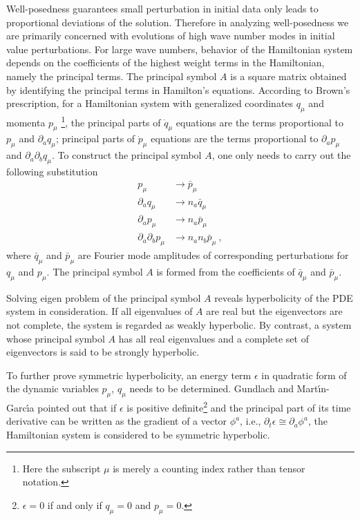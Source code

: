 Well-posedness guarantees small perturbation in initial data only leads to proportional deviations of the solution. Therefore in analyzing well-posedness we are primarily concerned with evolutions of high wave number modes in initial value perturbations. For large wave numbers, behavior of the Hamiltonian system depends on the coefficients of the highest weight terms in the Hamiltonian, namely the principal terms. The principal symbol $A$ is a square matrix obtained by identifying the principal terms in Hamilton's equations. According to Brown's prescription\cite{Brown:2008cca}, for a Hamiltonian system with generalized coordinates $q_{\mu}$ and momenta $p_{\mu}$ \footnote{Here the subscript $\mu$ is merely a counting index rather than tensor notation.}, the principal parts of ${\dot q}_{\mu}$ equations are the terms proportional to $p_{\mu}$ and $\partial_{a}q_{\mu}$; principal parts of ${\dot p}_{\mu}$ equations are the terms proportional to $\partial_{a}p_{\mu}$ and $\partial_{a}\partial_{b}q_{\mu}$. To construct the principal symbol $A$, one only needs to carry out the following substitution
\begin{subequations}\label{substitution}
\begin{align}
p_{\mu} & \rightarrow {\bar p}_{\mu}\\
\partial_{a}q_{\mu} &\rightarrow n_{a}{\bar q}_{\mu}\\
\partial_{a}p_{\mu} & \rightarrow n_{a}{\bar p}_{\mu}\\
\partial_{a}\partial_{b}p_{\mu} & \rightarrow n_{a}n_{b}{\bar p}_{\mu} \ ,
\end{align}
\end{subequations}
where ${\bar q}_{\mu}$ and ${\bar p}_{\mu}$ are Fourier mode amplitudes of corresponding perturbations for $q_{\mu}$ and $p_{\mu}$. The principal symbol $A$ is formed from the coefficients of ${\bar q}_{\mu}$ and ${\bar p}_{\mu}$. 

Solving eigen problem of the principal symbol $A$ reveals hyperbolicity of the PDE system in consideration. If all eigenvalues of $A$ are real but the eigenvectors are not complete, the system is regarded as weakly hyperbolic. By contrast, a system whose principal symbol $A$ has all real eigenvalues and a complete set of eigenvectors is said to be strongly hyperbolic. 

To further prove symmetric hyperbolicity, an energy term $\epsilon$ in quadratic form of the dynamic variables $p_{\mu}$, $q_{\mu}$ needs to be determined. Gundlach and Mart\' \i n-Garc\' \i a\cite{Gundlach:2005ta} pointed out that if $\epsilon$ is positive definite\footnote{$\epsilon = 0$ if and only if $q_{\mu} = 0$ and $p_{\mu} = 0$.} and the principal part of its time derivative can be written as the gradient of a vector $\phi^{a}$, i.e., $\partial_{t}\epsilon \cong \partial_{a}\phi^{a}$, the Hamiltonian system is considered to be symmetric hyperbolic. 

